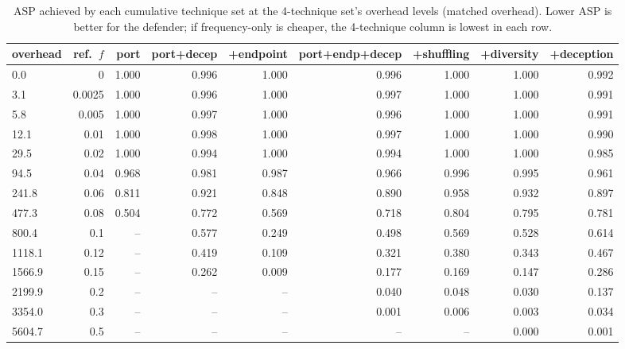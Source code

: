 \begin{table}[t]
\centering
\caption{ASP achieved by each cumulative technique set at the 4-technique set's overhead levels (matched overhead). Lower ASP is better for the defender; if frequency-only is cheaper, the 4-technique column is lowest in each row.}
\label{tab:c1_matched_overhead}
\begin{tabular}{lrrrrrrrr}
\toprule
overhead & ref.\ $f$ & port & port+decep & +endpoint & port+endp+decep & +shuffling & +diversity & +deception \\
\midrule
0.0 & 0 & 1.000 & 0.996 & 1.000 & 0.996 & 1.000 & 1.000 & 0.992 \\
3.1 & 0.0025 & 1.000 & 0.996 & 1.000 & 0.997 & 1.000 & 1.000 & 0.991 \\
5.8 & 0.005 & 1.000 & 0.997 & 1.000 & 0.996 & 1.000 & 1.000 & 0.991 \\
12.1 & 0.01 & 1.000 & 0.998 & 1.000 & 0.997 & 1.000 & 1.000 & 0.990 \\
29.5 & 0.02 & 1.000 & 0.994 & 1.000 & 0.994 & 1.000 & 1.000 & 0.985 \\
94.5 & 0.04 & 0.968 & 0.981 & 0.987 & 0.966 & 0.996 & 0.995 & 0.961 \\
241.8 & 0.06 & 0.811 & 0.921 & 0.848 & 0.890 & 0.958 & 0.932 & 0.897 \\
477.3 & 0.08 & 0.504 & 0.772 & 0.569 & 0.718 & 0.804 & 0.795 & 0.781 \\
800.4 & 0.1 & -- & 0.577 & 0.249 & 0.498 & 0.569 & 0.528 & 0.614 \\
1118.1 & 0.12 & -- & 0.419 & 0.109 & 0.321 & 0.380 & 0.343 & 0.467 \\
1566.9 & 0.15 & -- & 0.262 & 0.009 & 0.177 & 0.169 & 0.147 & 0.286 \\
2199.9 & 0.2 & -- & -- & -- & 0.040 & 0.048 & 0.030 & 0.137 \\
3354.0 & 0.3 & -- & -- & -- & 0.001 & 0.006 & 0.003 & 0.034 \\
5604.7 & 0.5 & -- & -- & -- & -- & -- & 0.000 & 0.001 \\
\bottomrule
\end{tabular}
\end{table}
